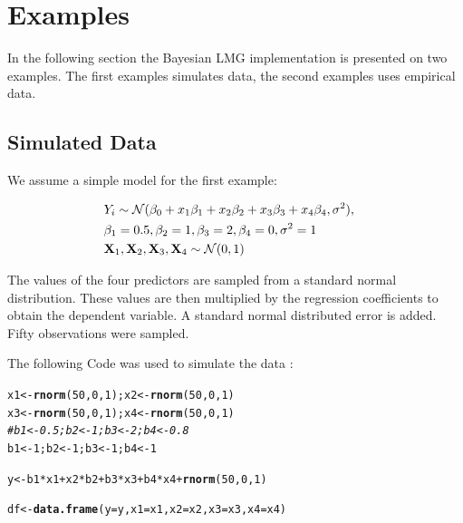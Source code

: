 \documentclass[11pt,a4paper,twoside]{book}
\makeatletter
\newcommand{\hlnum}[1]{\textcolor[rgb]{0.686,0.059,0.569}{#1}}%
\newcommand{\hlcom}[1]{\textcolor[rgb]{0.678,0.584,0.686}{\textit{#1}}}%
\newcommand{\hlopt}[1]{\textcolor[rgb]{0,0,0}{#1}}%
\newcommand{\hlstd}[1]{\textcolor[rgb]{0.345,0.345,0.345}{#1}}%
\newcommand{\hlkwb}[1]{\textcolor[rgb]{0.69,0.353,0.396}{#1}}%
\newcommand{\hlkwc}[1]{\textcolor[rgb]{0.333,0.667,0.333}{#1}}%
\newcommand{\hlkwd}[1]{\textcolor[rgb]{0.737,0.353,0.396}{\textbf{#1}}}%
\newenvironment{kframe}{%
 \def\at@end@of@kframe{}%
 \ifinner\ifhmode%
  \def\at@end@of@kframe{\end{minipage}}%
  \begin{minipage}{\columnwidth}%
 \fi\fi%
 \def\FrameCommand##1{\hskip\@totalleftmargin \hskip-\fboxsep
 \colorbox{shadecolor}{##1}\hskip-\fboxsep
     \hskip-\linewidth \hskip-\@totalleftmargin \hskip\columnwidth}%
 \MakeFramed {\advance\hsize-\width
   \@totalleftmargin\z@ \linewidth\hsize
   \@setminipage}}%
 {\par\unskip\endMakeFramed%
 \at@end@of@kframe}
\newenvironment{knitrout}{}{} %
\makeatother
\begin{document}






\chapter{Examples}

In the following section the Bayesian LMG implementation is presented on two examples. The first examples simulates data, the second examples uses empirical data.

\section{Simulated Data}

We assume a simple model for the first example: 

\begin{align*} 
&Y_{i} \sim \mathcal{N}(\beta_{0}+x_{1} \beta_{1}+x_{2} \beta_{2}+x_{3} \beta_{3}+x_{4} \beta_{4}, \sigma^2),& \\ & \beta_{1} = 0.5, \beta_{2} = 1,  \beta_{3} = 2 , \beta_{4}=0, \sigma^2 = 1 & \\ & {\mathbf{X}}_{1}, {\mathbf{X}}_{2},{\mathbf{X}}_{3},{\mathbf{X}}_{4} \sim \mathcal{N}(0, 1) 
\end{align*} 


The values of the four predictors are sampled from a standard normal distribution. These values are then multiplied by the regression coefficients to obtain the dependent variable. A standard normal distributed error is added. Fifty observations were sampled.

The following Code was used to simulate the data :

\begin{knitrout}
\color{fgcolor}\begin{kframe}
\begin{alltt}
\hlstd{x1} \hlkwb{<-} \hlkwd{rnorm}\hlstd{(}\hlnum{50}\hlstd{,} \hlnum{0}\hlstd{,} \hlnum{1}\hlstd{); x2} \hlkwb{<-} \hlkwd{rnorm}\hlstd{(}\hlnum{50}\hlstd{,} \hlnum{0}\hlstd{,} \hlnum{1}\hlstd{)}
\hlstd{x3} \hlkwb{<-} \hlkwd{rnorm}\hlstd{(}\hlnum{50}\hlstd{,} \hlnum{0}\hlstd{,} \hlnum{1}\hlstd{); x4} \hlkwb{<-} \hlkwd{rnorm}\hlstd{(}\hlnum{50}\hlstd{,} \hlnum{0}\hlstd{,} \hlnum{1}\hlstd{)}
\hlcom{#b1 <- 0.5; b2 <- 1; b3 <- 2; b4 <- 0.8}
\hlstd{b1} \hlkwb{<-} \hlnum{1}\hlstd{; b2} \hlkwb{<-} \hlnum{1}\hlstd{; b3} \hlkwb{<-} \hlnum{1}\hlstd{; b4} \hlkwb{<-} \hlnum{1}

\hlstd{y} \hlkwb{<-} \hlstd{b1}\hlopt{*}\hlstd{x1} \hlopt{+} \hlstd{x2}\hlopt{*}\hlstd{b2} \hlopt{+} \hlstd{b3}\hlopt{*}\hlstd{x3} \hlopt{+} \hlstd{b4}\hlopt{*}\hlstd{x4} \hlopt{+} \hlkwd{rnorm}\hlstd{(}\hlnum{50}\hlstd{,} \hlnum{0}\hlstd{,} \hlnum{1}\hlstd{)}


\hlstd{df} \hlkwb{<-} \hlkwd{data.frame}\hlstd{(}\hlkwc{y} \hlstd{= y,} \hlkwc{x1} \hlstd{= x1,} \hlkwc{x2} \hlstd{= x2,} \hlkwc{x3} \hlstd{= x3,} \hlkwc{x4} \hlstd{= x4)}
\end{alltt}
\end{kframe}
\end{knitrout}
\end{document}
